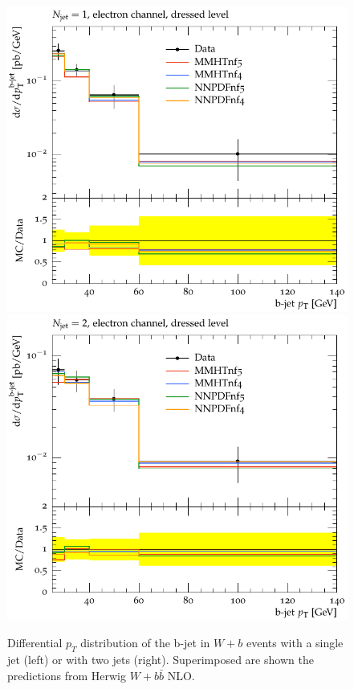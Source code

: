 \documentclass[11pt]{cernrep} \usepackage{graphicx,epsfig} 
\newcommand{\pt}{\ensuremath{p_{T}}\xspace}
\begin{document}
\begin{figure}[htbp]
\begin{center}
   \includegraphics[scale=0.65]{figs/wbb/herwig/d02-x01-y02.pdf}
   \includegraphics[scale=0.65]{figs/wbb/herwig/d02-x02-y02.pdf}
\end{center}
\caption{Differential \pt distribution of the b-jet in $W+b$ events with a single jet (left) or with two jets (right). Superimposed are
shown the predictions from Herwig $W+b\bar{b}$ NLO.}
\label{wbb-pt-herwig}
\end{figure}
\end{document}
